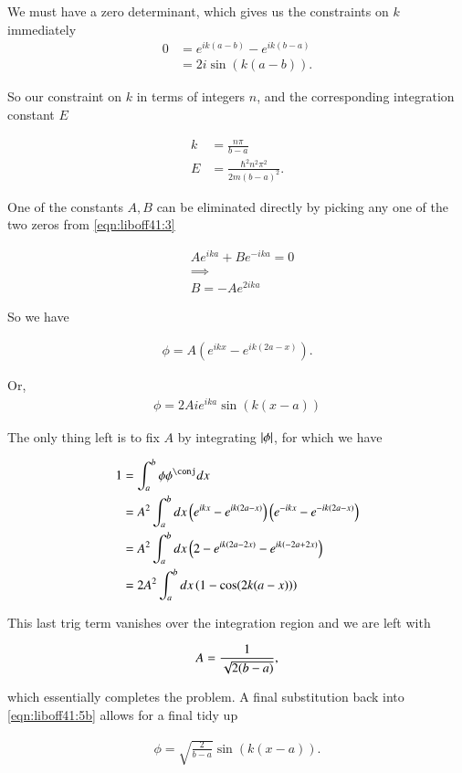 We must have a zero determinant, which gives us the constraints on $k$ immediately
\begin{align*}
0 &= e^{i k (a - b)} - e^{i k (b-a)} \\
&= 2 i \sin( k (a - b) ).
\end{align*}

So our constraint on $k$ in terms of integers $n$, and the corresponding integration constant $E$

\begin{align}\label{eqn:liboff41:4}
k &= \frac{n \pi}{b - a} \\
E &= \frac{\hbar^2 n^2 \pi^2 }{2 m (b-a)^2}.
\end{align}

One of the constants $A,B$ can be eliminated directly by picking any one of the two zeros from \ref{eqn:liboff41:3}

\begin{align*}
&A e ^{i k a } + B e^{-i k a} = 0 \\
&\implies \\
&B = -A e ^{2 i k a } 
\end{align*}

So we have

\begin{align}\label{eqn:liboff41:5}
\phi = A \left( e^{i k x } - e^{ ik (2a - x) } \right).
\end{align}

Or,
\begin{align}\label{eqn:liboff41:5b}
\phi = 2 A i e^{i k a} \sin( k (x-a )) 
\end{align}

The only thing left is to fix $A$ by integrating $\left\lvert{\phi}\right\rvert$, for which we have

\begin{align*}
1 &= \int_a^b \phi \phi^\conj dx \\
&= A^2 \int_a^b dx \left( e^{i k x } - e^{ ik (2a - x) } \right) \left( e^{-i k x } - e^{ -ik (2a - x) } \right) \\
&= A^2 \int_a^b dx \left( 2 - e^{ik(2a - 2x)} - e^{ik(-2a + 2x)} \right) \\
&= 2 A^2 \int_a^b dx \left( 1 - \cos (2 k (a - x)) \right)
\end{align*}

This last trig term vanishes over the integration region and we are left with 

\begin{align}\label{eqn:liboff41:6}
A = \frac{1}{ \sqrt{2 (b-a)}},
\end{align}

which essentially completes the problem.  A final substitution back into \ref{eqn:liboff41:5b} allows for a final tidy up

\begin{align}\label{eqn:liboff41:5c}
\phi = \sqrt{\frac{2}{b-a}} \sin( k (x-a )).
\end{align}

\EndArticle
